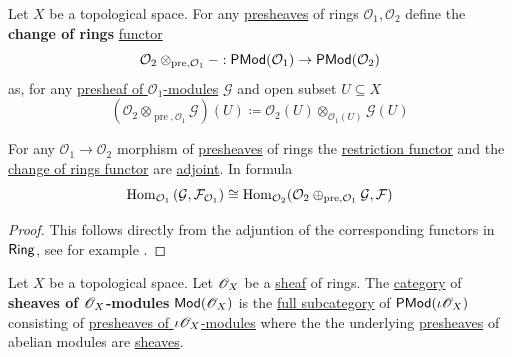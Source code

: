 \documentclass[../../../main]{subfiles}
\begin{document}
\begin{definition} \label{def:tensor-product-presheaf}
  Let \(X\) be a topological space.
  For any \hyperref[def:presheaf]{presheaves} of rings \(\mathcal{O}_{1}, \mathcal{O}_{2}\) define the \textbf{change of rings} \hyperref[def:functor]{functor}
  \begin{equation*}
    \mathcal{O}_{2} \otimes_{\operatorname{pre}, \mathcal{O}_{1}} -: \mathsf{PMod}(\mathcal{O}_{1}) \to \mathsf{PMod}(\mathcal{O}_{2})
  \end{equation*}
  as, for any \hyperref[def:presheaf-of-modules]{presheaf of \(\mathcal{O}_{1}\)-modules} \(\mathcal{G}\) and open subset \(U \subseteq X\)
  \begin{equation*}
    (\mathcal{O}_{2} \otimes_{\operatorname{pre}, \mathcal{O}_{1}} \mathcal{G})(U) \coloneq \mathcal{O}_{2}(U) \otimes_{\mathcal{O}_{1}(U)} \mathcal{G}(U)
  \end{equation*}
\end{definition}

\begin{lemma} \label{lemma:restriction-tensor-adjunction-presheaf}
  For any \(\mathcal{O}_{1} \to  \mathcal{O}_{2}\) morphism of \hyperref[def:presheaf]{presheaves} of rings the \hyperref[def:restriction-presheaf-of-modules]{restriction functor} and the \hyperref[def:tensor-product-presheaf]{change of rings functor} are \hyperref[def:adjoint-functors]{adjoint}. In formula
  \begin{equation*}
    \operatorname{Hom}_{\mathcal{O}_{1}} \left( \mathcal{G}, \mathcal{F}_{\mathcal{O}_{1}} \right) \cong \operatorname{Hom}_{\mathcal{O}_{2}} (\mathcal{O}_{2} \oplus_{\operatorname{pre}, \mathcal{O}_{1}} \mathcal{G}, \mathcal{F})
  \end{equation*}
\end{lemma}
\begin{proof}
  This follows directly from the adjuntion of the corresponding functors in \(\mathsf{Ring}\), see for example \cite{}.
\end{proof}

\begin{definition} \label{def:sheaf-of-modules}
  Let \(X\) be a topological space.
  Let \(\mathscr{O}_{X}\) be a \hyperref[def:sheaf]{sheaf} of rings.
  The \hyperref[def:category]{category} of \textbf{sheaves of \(\mathscr{O}_{X}\)-modules} \(\mathsf{Mod}(\mathscr{O}_{X})\) is the \hyperref[def:subcategory]{full subcategory} of \(\mathsf{PMod}(\iota\mathscr{O}_{X})\) consisting of \hyperref[def:presheaf-of-modules]{presheaves of \(\iota\mathscr{O}_{X}\)-modules} where the the underlying \hyperref[def:presheaf]{presheaves} of abelian modules are \hyperref[def:sheaf]{sheaves}.
\end{definition}
\end{document}
